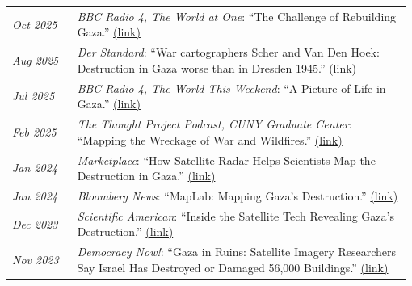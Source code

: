 \documentclass[letterpaper,11pt,oneside]{article}
\newcommand{\datefmt}[1]{\textit{#1}}
\begin{document}
\begin{longtable}{@{}p{0.16\linewidth}p{0.82\linewidth}@{}}

\datefmt{Oct 2025} & \textit{BBC Radio 4, The World at One}: “The Challenge of Rebuilding Gaza.” \href{https://www.bbc.co.uk/programmes/m002krh9}{(link)}\\[1.0ex]

\datefmt{Aug 2025} & \textit{Der Standard}: “War cartographers Scher and Van Den Hoek: Destruction in Gaza worse than in Dresden 1945.” \href{https://www.derstandard.at/consent/tcf/story/3000000275648/kriegskartografen-scher-und-van-den-hoek-zerstoerung-in-gaza-schlimmer-als-in-dresden-1945}{(link)}\\[1.0ex]

\datefmt{Jul 2025} & \textit{BBC Radio 4, The World This Weekend}: “A Picture of Life in Gaza.” \href{https://www.bbc.co.uk/programmes/m002g343}{(link)}\\[1.0ex]

\datefmt{Feb 2025} & \textit{The Thought Project Podcast, CUNY Graduate Center}: “Mapping the Wreckage of War and Wildfires.” \href{https://open.spotify.com/episode/39C3CPxsW6thg6EoctCtkz?si=74d62f211ff047a7}{(link)}\\[1.0ex]

\datefmt{Jan 2024} & \textit{Marketplace}: “How Satellite Radar Helps Scientists Map the Destruction in Gaza.” \href{https://www.marketplace.org/episode/2024/01/25/how-satellite-radar-helps-scientists-map-the-destruction-in-gaza}{(link)}\\[1.0ex]

\datefmt{Jan 2024} & \textit{Bloomberg News}: “MapLab: Mapping Gaza’s Destruction.” \href{https://www.bloomberg.com/news/newsletters/2024-01-24/maplab-mapping-gaza-s-destruction}{(link)}\\[1.0ex]

\datefmt{Dec 2023} & \textit{Scientific American}: “Inside the Satellite Tech Revealing Gaza’s Destruction.” \href{https://www.scientificamerican.com/article/inside-the-satellite-tech-revealing-gazas-destruction/}{(link)}\\[1.0ex]

\datefmt{Nov 2023} & \textit{Democracy Now!}: “Gaza in Ruins: Satellite Imagery Researchers Say Israel Has Destroyed or Damaged 56,000 Buildings.” \href{http://democracynow.org/2023/11/22/radar}{(link)}\\[1.0ex]

\end{longtable}
\vspace{-4ex}
\end{document}
